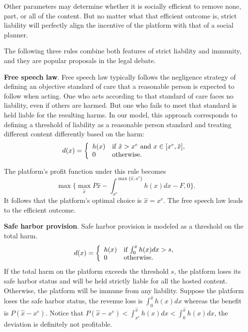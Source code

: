 Other parameters may determine whether it is socially efficient to remove none, part, or all of the content. But no matter what that efficient outcome is, strict liability will perfectly align the incentive of the platform with that of a social planner.

The following three rules combine both features of strict liability and immunity, and they are popular proposals in the legal debate.

\textbf{Free speech law}.
Free speech law typically follows the negligence strategy of defining an objective standard of care that a reasonable person is expected to follow when acting. One who acts according to that standard of care faces no liability, even if others are harmed. But one who fails to meet that standard is held liable for the resulting harms. In our model, this approach corresponds to defining a threshold of liability as a reasonable person standard and treating different content differently based on the harm:
\begin{equation}
d(x)=
\lt\{\begin{array}{ll}
    h(x) & \mbox{if $\hat{x}>x^e$ and $x\in[x^e,\hat{x}]$}, \\ %
    0 & \mbox{otherwise}.
\end{array}\rt.
\end{equation}

The platform's profit function under this rule becomes
\begin{equation}\label{eqn:profit_fs}
    \max\{\max_{\hat{x}}P\hat{x} - \int_{x^e}^{\max\{\hat{x},x^e\}}h(x)dx-F, 0\}.
\end{equation}
It follows that the platform's optimal choice is $\hat{x}=x^e$. The free speech law leads to the efficient outcome.


\textbf{Safe harbor provision}.
Safe harbor provision is modeled as a threshold on the total harm. 
\begin{equation}
d(x)=
\left\{\begin{array}{ll}
    h(x) & \mbox{if $\int_0^{\hat{x}}h(x)dx>s$}, \\
    0 & \mbox{otherwise}.
\end{array}\right.
\end{equation}
If the total harm on the platform exceeds the threshold $s$, the platform loses its safe harbor status and will be held strictly liable for all the hosted content. Otherwise, the platform will be immune from any liability. Suppose the platform loses the safe harbor status, the revenue loss is $\int_0^{\hat{x}}h(x)dx$ whereas the benefit is $P(\hat{x}-x^e)$. Notice that $P(\hat{x}-x^e)<\int_{x^e}^{\hat{x}}h(x)dx<\int_0^{\hat{x}}h(x)dx$, the deviation is definitely not profitable. 

